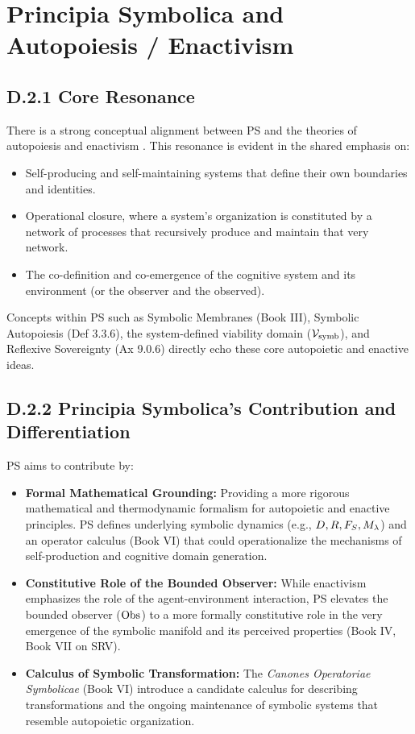 \section*{Principia Symbolica and Autopoiesis / Enactivism} \label{sec:appD_ps_and_autopoiesis_enactivism}
\subsection*{D.2.1 Core Resonance}
\label{subsec:appD_autopoiesis_core_resonance}
There is a strong conceptual alignment between PS and the theories of autopoiesis \cite{maturana1980autopoiesis} and enactivism \cite{maturana1980}. This resonance is evident in the shared emphasis on:
\begin{itemize}
    \item Self-producing and self-maintaining systems that define their own boundaries and identities.
    \item Operational closure, where a system's organization is constituted by a network of processes that recursively produce and maintain that very network.
    \item The co-definition and co-emergence of the cognitive system and its environment (or the observer and the observed).
\end{itemize}
Concepts within PS such as Symbolic Membranes (Book III), Symbolic Autopoiesis (Def 3.3.6), the system-defined viability domain (\(\mathcal{V}_{\mathrm{symb}}\)), and Reflexive Sovereignty (Ax 9.0.6) directly echo these core autopoietic and enactive ideas.
\subsection*{D.2.2 Principia Symbolica's Contribution and Differentiation} \label{subsec:appD_autopoiesis_contribution_differentiation}
PS aims to contribute by:
\begin{itemize}
    \item \textbf{Formal Mathematical Grounding:} 
    Providing a more rigorous mathematical and thermodynamic formalism for autopoietic and enactive principles. PS defines underlying symbolic dynamics (e.g., \(D, R, F_S, M_\lambda\)) and an operator calculus (Book VI) that could operationalize the mechanisms of self-production and cognitive domain generation.
    \item \textbf{Constitutive Role of the Bounded Observer:} 
    While enactivism emphasizes the role of the agent-environment interaction, PS elevates the bounded observer (\(\mathrm{Obs}\)) to a more formally constitutive role in the very emergence of the symbolic manifold and its perceived properties (Book IV, Book VII on SRV).
    \item \textbf{Calculus of Symbolic Transformation:} 
    The \emph{Canones Operatoriae Symbolicae} (Book VI) introduce a candidate calculus for describing transformations and the ongoing maintenance of symbolic systems  
that resemble autopoietic organization.
\end{itemize}
